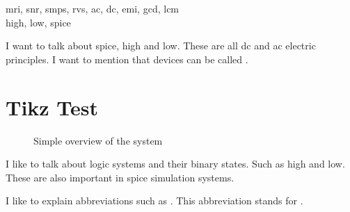 \gls{mri}, \gls{snr}, \gls{smps}, \gls{rvs}, \gls{ac}, \gls{dc}, \gls{emi}, \gls{gcd}, \gls{lcm} \\
\gls{high}, \gls{low}, \gls{spice}


I want to talk about \gls{spice}, \gls{high} and \gls{low}. These are all \gls{dc} and \gls{ac} electric principles. I want to mention that  devices can be called .

\section{Tikz Test}
\begin{figure}[h]
	\centering 
	\resizebox{\textwidth}{!}{
		
	}
	\caption{Simple overview of the system}
	\label{fig:system_overview}
\end{figure}

I like to talk about logic systems and their binary states. Such as \gls{high} and \gls{low}. These are also important in \gls{spice} simulation systems.

I like to explain abbreviations such as . This abbreviation stands for .